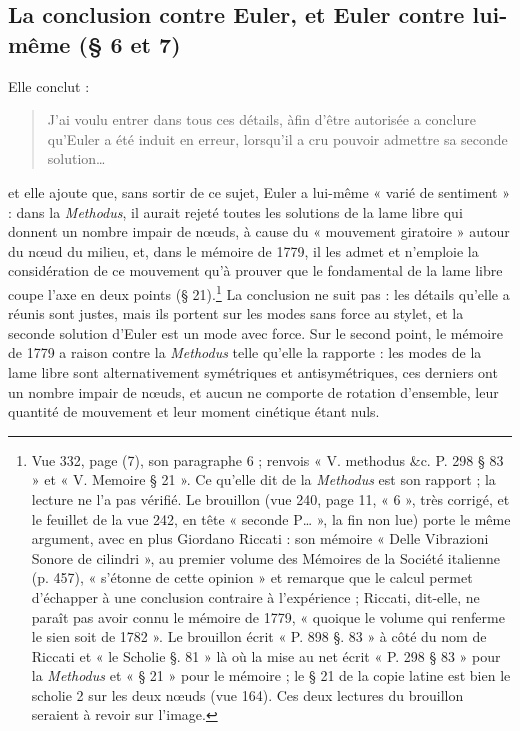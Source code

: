 \documentclass[11pt,a4paper]{article}
\begin{document}
\subsection*{La conclusion contre Euler, et Euler contre lui-même (§ 6 et 7)}

Elle conclut :
\begin{quote}
J'ai voulu entrer dans tous ces détails, àfin d'être autorisée a conclure qu'Euler a été induit en erreur, lorsqu'il a cru pouvoir admettre sa seconde solution…
\end{quote}
et elle ajoute que, sans sortir de ce sujet, Euler a lui-même « varié de sentiment » : dans la \emph{Methodus}, il aurait rejeté toutes les solutions de la lame libre qui donnent un nombre impair de nœuds, à cause du « mouvement giratoire » autour du nœud du milieu, et, dans le mémoire de 1779, il les admet et n'emploie la considération de ce mouvement qu'à prouver que le fondamental de la lame libre coupe l'axe en deux points (§ 21).\footnote{Vue 332, page (7), son paragraphe 6 ; renvois « V. methodus \&c. P. 298 § 83 » et « V. Memoire § 21 ». Ce qu'elle dit de la \emph{Methodus} est son rapport ; la lecture ne l'a pas vérifié. Le brouillon (vue 240, page 11, « 6 », très corrigé, et le feuillet de la vue 242, en tête « seconde P… », la fin non lue) porte le même argument, avec en plus Giordano Riccati : son mémoire « Delle Vibrazioni Sonore de cilindri », au premier volume des Mémoires de la Société italienne (p. 457), « s'étonne de cette opinion » et remarque que le calcul permet d'échapper à une conclusion contraire à l'expérience ; Riccati, dit-elle, ne paraît pas avoir connu le mémoire de 1779, « quoique le volume qui renferme le sien soit de 1782 ». Le brouillon écrit « P. 898 §. 83 » à côté du nom de Riccati et « le Scholie §. 81 » là où la mise au net écrit « P. 298 § 83 » pour la \emph{Methodus} et « § 21 » pour le mémoire ; le § 21 de la copie latine est bien le scholie 2 sur les deux nœuds (vue 164). Ces deux lectures du brouillon seraient à revoir sur l'image.} La conclusion ne suit pas : les détails qu'elle a réunis sont justes, mais ils portent sur les modes sans force au stylet, et la seconde solution d'Euler est un mode avec force. Sur le second point, le mémoire de 1779 a raison contre la \emph{Methodus} telle qu'elle la rapporte : les modes de la lame libre sont alternativement symétriques et antisymétriques, ces derniers ont un nombre impair de nœuds, et aucun ne comporte de rotation d'ensemble, leur quantité de mouvement et leur moment cinétique étant nuls.
\end{document}
